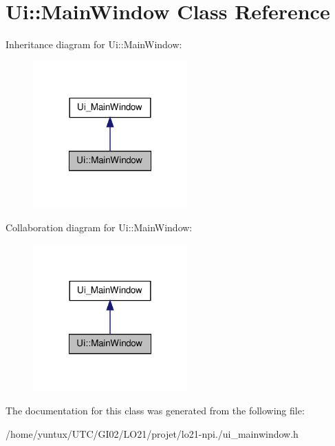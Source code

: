 \hypertarget{class_ui_1_1_main_window}{\section{\-Ui\-:\-:\-Main\-Window \-Class \-Reference}
\label{class_ui_1_1_main_window}
}


\-Inheritance diagram for \-Ui\-:\-:\-Main\-Window\-:
\nopagebreak
\begin{figure}[H]
\begin{center}
\leavevmode
\includegraphics[width=168pt]{class_ui_1_1_main_window__inherit__graph}
\end{center}
\end{figure}


\-Collaboration diagram for \-Ui\-:\-:\-Main\-Window\-:
\nopagebreak
\begin{figure}[H]
\begin{center}
\leavevmode
\includegraphics[width=168pt]{class_ui_1_1_main_window__coll__graph}
\end{center}
\end{figure}


\-The documentation for this class was generated from the following file\-:\begin{DoxyCompactItemize}
\item 
/home/yuntux/\-U\-T\-C/\-G\-I02/\-L\-O21/projet/lo21-\/npi./ui\-\_\-mainwindow.\-h\end{DoxyCompactItemize}

